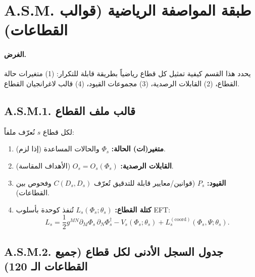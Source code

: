 \documentclass[13pt,a4paper]{article}
\begin{document}
	\section*{A.S.M. طبقة المواصفة الرياضية (قوالب القطاعات)}
	\label{sec:sector-math-layer}
	
	\paragraph{الغرض.}
	يحدد هذا القسم كيفية تمثيل كل قطاع رياضياً بطريقة قابلة للتكرار: (1) متغيرات حالة القطاع، (2) القابلات الرصدية، (3) مجموعات القيود، (4) قالب لاغرانجيان القطاع.
	
	\subsection*{A.S.M.1. قالب ملف القطاع}
	
	لكل قطاع $s$ نُعرّف ملفاً:
	\begin{enumerate}[leftmargin=*]
		\item \textbf{متغير(ات) الحالة:} $\Phi_s$ والحالات المساعدة (إذا لزم).
		\item \textbf{القابلات الرصدية:} $O_s=O_s(\Phi_s)$ (الأهداف المقاسة).
		\item \textbf{القيود:} $P_s$ (قوانين/معايير قابلة للتدقيق تُعرّف $C(D_s,D_s)$ وفحوص بين القطاعات).
		\item \textbf{كتلة القطاع:} $L_s(\Phi_s;\theta_s)$ تُنفذ كوحدة بأسلوب EFT:
		$$
		L_s = \frac{1}{2}g^{MN}\partial_M\Phi_s\,\partial_N\Phi_s^\dagger - V_s(\Phi_s;\theta_s) + L^{(\mathrm{coord})}_s(\Phi_s,\Psi;\theta_s).
		$$
	\end{enumerate}
	
	\subsection*{A.S.M.2. جدول السجل الأدنى لكل قطاع (جميع القطاعات الـ 120)}
	
\end{document}

